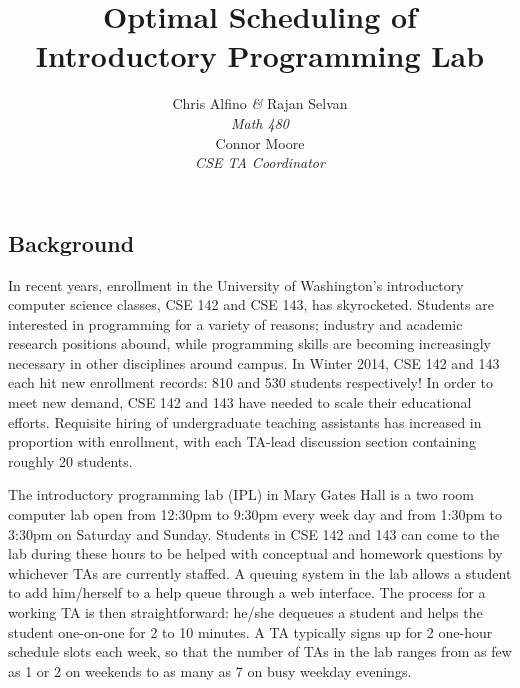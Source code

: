 \documentclass{article}
\begin{document}
\title{\textbf{Optimal Scheduling of Introductory Programming Lab}}
\author{
   Chris Alfino \textit{\&} Rajan Selvan\\
   \vspace{12pt}
   \small\textit{Math 480}\\
   Connor Moore\\
   \small\textit{CSE TA Coordinator}}
\date{}

\maketitle
\noindent\makebox[\linewidth]{\rule{\textwidth}{0.4pt}}

\setlength\columnsep{0.45in}
\setlength{\parskip}{0.5em}
\begin{multicols}{2}

\section*{Background}

In recent years, enrollment in the University of Washington's introductory computer science classes, CSE 142 and CSE 143, has skyrocketed. Students are interested in programming for a variety of reasons; industry and academic research positions abound, while programming skills are becoming increasingly necessary in other disciplines around campus. In Winter 2014, CSE 142 and 143 each hit new enrollment records: 810 and 530 students respectively! In order to meet new demand, CSE 142 and 143 have needed to scale their educational efforts. Requisite hiring of undergraduate teaching assistants has increased in proportion with enrollment, with each TA-lead discussion section containing roughly 20 students.

The introductory programming lab (IPL) in Mary Gates Hall is a two room computer lab open from 12:30pm to 9:30pm every week day and from 1:30pm to 3:30pm on Saturday and Sunday. Students in CSE 142 and 143 can come to the lab during these hours to be helped with conceptual and homework questions by whichever TAs are currently staffed. A queuing system in the lab allows a student to add him/herself to a help queue through a web interface. The process for a working TA is then straightforward: he/she dequeues a student and helps the student one-on-one for 2 to 10 minutes. A TA typically signs up for 2 one-hour schedule slots each week, so that the number of TAs in the lab ranges from as few as 1 or 2 on weekends to as many as 7 on busy weekday evenings.


\end{multicols}
\end{document}
